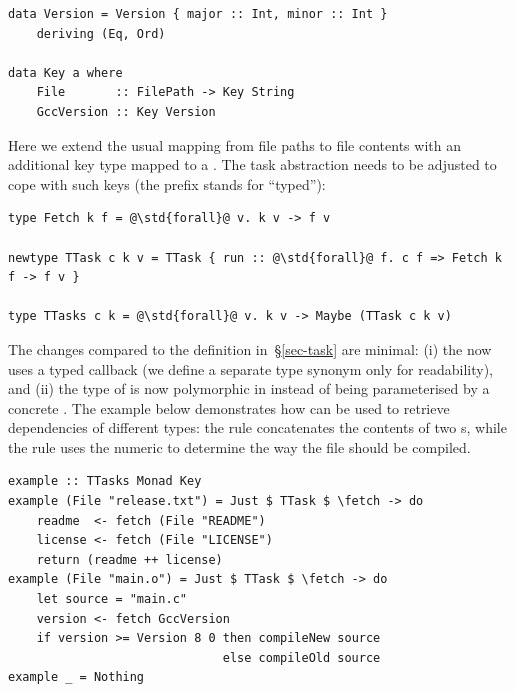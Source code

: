 \vspace{1mm}
\begin{verbatim}
data Version = Version { major :: Int, minor :: Int }
    deriving (Eq, Ord)

data Key a where
    File       :: FilePath -> Key String
    GccVersion :: Key Version
\end{verbatim}
\vspace{1mm}

\noindent
Here we extend the usual mapping from file paths to file contents with an
additional key type  mapped to a . The task
abstraction needs to be adjusted to cope with such keys (the prefix 
stands for ``typed''):

\vspace{1mm}
\begin{verbatim}
type Fetch k f = @\std{forall}@ v. k v -> f v

newtype TTask c k v = TTask { run :: @\std{forall}@ f. c f => Fetch k f -> f v }

type TTasks c k = @\std{forall}@ v. k v -> Maybe (TTask c k v)
\end{verbatim}
\vspace{1mm}

\noindent
The changes compared to the definition in~\S\ref{sec-task} are minimal: (i) the
 now uses a typed  callback (we define a separate type
synonym only for readability), and (ii) the type of  is now
polymorphic in  instead of being parameterised by a concrete . The
example below demonstrates how  can be used to retrieve dependencies
of different types: the rule  concatenates the contents of two
s, while the rule  uses the numeric  to
determine the way the  file should be compiled.

\vspace{1mm}
\begin{verbatim}
example :: TTasks Monad Key
example (File "release.txt") = Just $ TTask $ \fetch -> do
    readme  <- fetch (File "README")
    license <- fetch (File "LICENSE")
    return (readme ++ license)
example (File "main.o") = Just $ TTask $ \fetch -> do
    let source = "main.c"
    version <- fetch GccVersion
    if version >= Version 8 0 then compileNew source
                              else compileOld source
example _ = Nothing
\end{verbatim}
\vspace{1mm}

